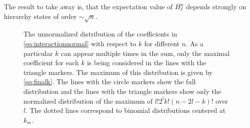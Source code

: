 The result to take away is, that the expectation value of \(H_I^n\)
depends strongly on hierarchy states of order \(\sim \sqrt{n}\).

\begin{figure}[htp]
  \centering
  \caption{\label{fig:kdist}The unnormalized distribution of the
    coefficients in \cref{eq:interactionnormal} with respect to \(k\)
    for different \(n\). As a particular \(k\) can appear multiple
    times in the sum, only the maximal coefficient for each \(k\) is
    being considered in the lines with the triangle markers. The
    maximum of this distribution is given by \cref{eq:finalk}. The
    lines with the circle markers show the full distribution and the
    lines with the triangle markers show only the normalized
    distribution of the maximum of \(l! 2^l k! (n-2l-k)!\) over \(l\).
    The dotted lines correspond to binomial distributions centered at
    \(k_m\).}
\end{figure}
